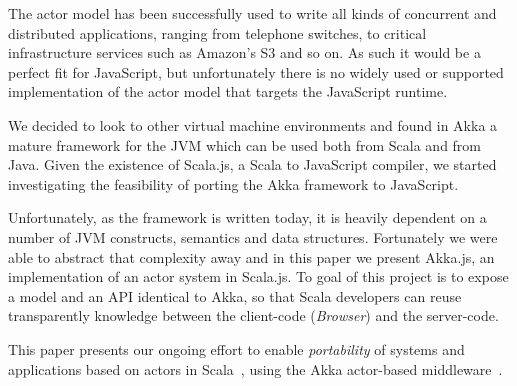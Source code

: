 \documentclass{sig-alternate}
\begin{document}
The actor model has been successfully used to write all kinds of concurrent and distributed applications, ranging from telephone switches, to critical infrastructure services such as Amazon's S3 and so on. As such it would be a perfect fit for JavaScript, but unfortunately there is no widely used or supported implementation of the actor model that targets the JavaScript runtime.

We decided to look to other virtual machine environments and found in Akka a mature framework for the JVM which can be used both from Scala and from Java. Given the existence of Scala.js, a Scala to JavaScript compiler, we started investigating the feasibility of porting the Akka framework to JavaScript.

Unfortunately, as the framework is written today, it is heavily dependent on a number of JVM constructs, semantics and data structures. Fortunately we were able to abstract that complexity away and in this paper we present Akka.js, an implementation of an actor system in Scala.js. To goal of this project is to expose a model and an API identical to Akka, so that Scala developers can reuse transparently knowledge between the client-code (\emph{Browser}) and the server-code.

%

This paper presents our ongoing effort to enable {\em portability} of systems and applications based on actors in Scala~\cite{ActorsInScala}, using the Akka actor-based middleware~\cite{Akka}.
\end{document}
